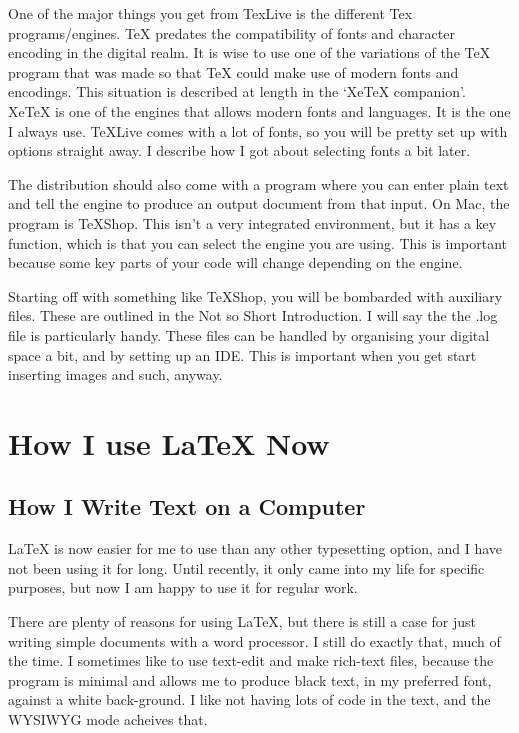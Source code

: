 \documentclass[12pt, oneside]{memoir}
\begin{document}
One of the major things you get from TexLive is the different Tex programs/engines. TeX predates the compatibility of fonts and character encoding in the digital realm. It is wise to use one of the variations of the TeX program that was made so that TeX could make use of modern fonts and encodings. This situation is described at length in the `XeTeX companion'. XeTeX is one of the engines that allows modern fonts and languages. It is the one I always use. TeXLive comes with a lot of fonts, so you will be pretty set up with options straight away. I describe how I got about selecting fonts a bit later.

The distribution should also come with a program where you can enter plain text and tell the engine to produce an output document from that input. On Mac, the program is TeXShop. This isn't a very integrated environment, but it has a key function, which is that you can select the engine you are using. This is important because some key parts of your code will change depending on the engine.

Starting off with something like TeXShop, you will be bombarded with auxiliary files. These are outlined in the Not so Short Introduction. I will say the the .log file is particularly handy. These files can be handled by organising your digital space a bit, and by setting up an IDE. This is important when you get start inserting images and such, anyway.

\section{How I use LaTeX Now}

\subsection{How I Write Text on a Computer}

LaTeX is now easier for me to use than any other typesetting option, and I have not been using it for long. Until recently, it only came into my life for specific purposes, but now I am happy to use it for regular work.

There are plenty of reasons for using LaTeX, but there is still a case for just writing simple documents with a word processor. I still do exactly that, much of the time. I sometimes like to use text-edit and make rich-text files, because the program is minimal and allows me to produce black text, in my preferred font, against a white back-ground. I like not having lots of code in the text, and the WYSIWYG mode acheives that.
\end{document}
